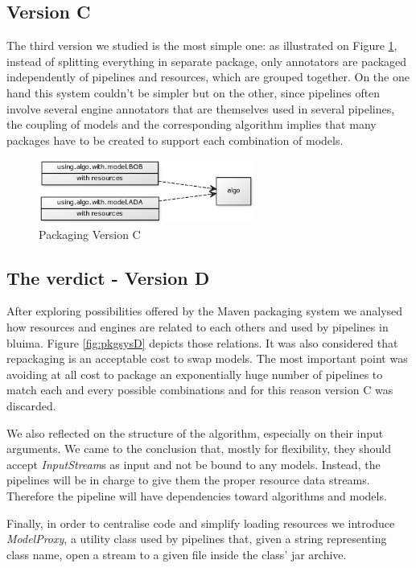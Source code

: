 \documentclass{article}
\newcommand{\id}[1]{\mbox{\textit{#1}}}
\begin{document}
\subsection{Version C}

The third version we studied is the most simple one: as illustrated on Figure \ref{fig:pkgsysC}, instead of splitting everything in separate package, only annotators are packaged independently of pipelines and resources, which are grouped together. On the one hand this system couldn't be simpler but on the other, since pipelines often involve several engine annotators that are themselves used in several pipelines, the coupling of models and the corresponding algorithm implies that many packages have to be created to support each combination of models.


\begin{figure}
\centering
\includegraphics[width=200pt]{res/packaging_version_C.png}
\caption{Packaging Version C}
\label{fig:pkgsysC}
\end{figure}


\subsection{The verdict - Version D}

After exploring possibilities offered by the Maven packaging system we analysed how resources and engines are related to each others and used by pipelines in bluima. Figure \ref{fig:pkgsysD} depicts those relations. It was also considered that repackaging is an acceptable cost to swap models. The most important point was avoiding at all cost to package an exponentially huge number of pipelines to match each and every possible combinations and for this reason version C was discarded.

We also reflected on the structure of the algorithm, especially on their input arguments. We came to the conclusion that, mostly for flexibility, they should accept \id{InputStream}s as input and not be bound to any models. Instead, the pipelines will be in charge to give them the proper resource data streams. Therefore the pipeline will have dependencies toward algorithms and models.

Finally, in order to centralise code and simplify loading resources we introduce \id{ModelProxy}, a utility class used by pipelines that, given a string representing class name, open a stream to a given file inside the class' jar archive.
\end{document}

